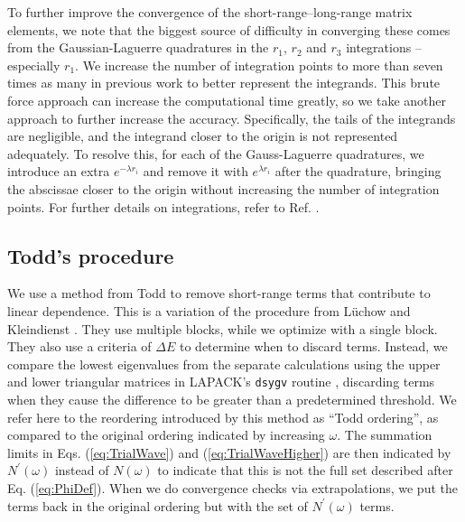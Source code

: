 \documentclass[preprint,showpacs,preprintnumbers,amsmath,amssymb,longbibliography,pra,aps]{revtex4-1}
\newcommand{\todoi}{\todo[inline]}
\begin{document}
To further improve the convergence of the short-range--long-range matrix elements, we note that the biggest source of difficulty in converging these comes from the Gaussian-Laguerre quadratures in the $r_1$, $r_2$ and $r_3$ integrations -- especially $r_1$. We increase the number of integration points to more than seven times as many in previous work \cite{VanReeth2003,VanReeth2004} to better represent the integrands. This brute force approach can increase the computational time greatly, so we take another approach to further increase the accuracy. Specifically, the tails of the integrands are negligible, and the integrand closer to the origin is not represented adequately. To resolve this, for each of the Gauss-Laguerre quadratures, we introduce an extra $e^{-\lambda r_i}$ and remove it with $e^{\lambda r_i}$ after the quadrature, bringing the abscissae closer to the origin without increasing the number of integration points. For further details on integrations, refer to Ref. \cite{Woods2015}.

\subsection{Todd's procedure}
\label{sec:Todd}
We use a method from Todd \cite{Todd2007} to remove short-range terms that contribute to linear dependence. This is a variation of the procedure from L\"uchow and Kleindienst \cite{Luchow1992}. They use multiple blocks, while we optimize with a single block. They also use a criteria of $\Delta E$ to determine when to discard terms. Instead, we compare the lowest eigenvalues from the separate calculations using the upper and lower triangular matrices in LAPACK's \texttt{dsygv} routine \cite{LAPACK}, discarding terms when they cause the difference to be greater than a predetermined threshold. We refer here to the reordering introduced by this method as ``Todd ordering'', as compared to the original ordering indicated by increasing $\omega$. The summation limits in Eqs. (\ref{eq:TrialWave}) and (\ref{eq:TrialWaveHigher}) are then indicated by $N^\prime(\omega)$ instead of $N(\omega)$ to indicate that this is not the full set described after Eq. (\ref{eq:PhiDef}). When we do convergence checks via extrapolations, we put the terms back in the original ordering but with the set of $N^\prime(\omega)$ terms.
\end{document}

